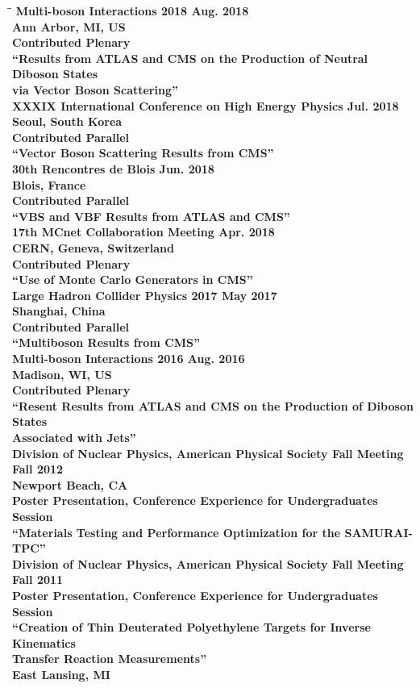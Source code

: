 \documentclass[10pt]{res} %
\begin{document}
\begin{resume}
\begin{tabbing}
\hspace{2.3in}\= \hspace{2.6in}\= \kill %
\bf{Multi-boson Interactions 2018} 		 \> \>	    Aug. 2018 \\
Ann Arbor, MI, US \\
Contributed Plenary \\ 
``Results from ATLAS and CMS on the Production of Neutral Diboson States \\via Vector Boson Scattering'' \\
\bf{XXXIX International Conference on High Energy Physics} 		 \> \>	    Jul. 2018 \\
Seoul, South Korea\\
Contributed Parallel\\ 
``Vector Boson Scattering Results from CMS'' \\
\bf{30th Rencontres de Blois} 		 \> \>	    Jun. 2018 \\
Blois, France\\
Contributed Parallel\\ 
``VBS and VBF Results from ATLAS and CMS'' \\
\bf{17th MCnet Collaboration Meeting} 		 \> \>	    Apr. 2018 \\
CERN, Geneva, Switzerland \\
Contributed Plenary\\ 
``Use of Monte Carlo Generators in CMS'' \\
\bf{Large Hadron Collider Physics 2017} 		 \> \>	    May 2017 \\
Shanghai, China \\
Contributed Parallel \\ 
``Multiboson Results from CMS'' \\

\bf{Multi-boson Interactions 2016} 		 \> \>	    Aug. 2016 \\
Madison, WI, US \\
Contributed Plenary \\ 
``Resent Results from ATLAS and CMS on the Production of Diboson States \\Associated with Jets'' \\
\bf{Division of Nuclear Physics, American Physical Society Fall Meeting} 		 \> \>	    Fall 2012 \\
Newport Beach, CA \\
Poster Presentation, Conference Experience for Undergraduates Session\\ 
``Materials Testing and Performance Optimization for the SAMURAI-TPC'' \\
\bf{Division of Nuclear Physics, American Physical Society Fall Meeting} 		 \> \>	    Fall 2011 \\
Poster Presentation, Conference Experience for Undergraduates Session\\ 
``Creation of Thin Deuterated Polyethylene Targets for Inverse Kinematics \\Transfer Reaction Measurements'' \\
East Lansing, MI \\
\end{tabbing}


\end{resume}
\end{document}
